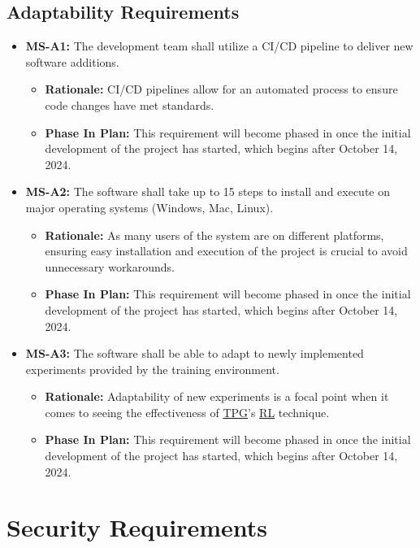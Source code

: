 \documentclass[12pt]{article}
\newcommand{\lips}{\textit{Insert your content here.}}
\begin{document}
\subsection{Adaptability Requirements}
\begin{itemize}
  \item \label{MS-A1} \textbf{MS-A1:} The development team shall utilize a CI/CD pipeline to deliver new software additions.
  \begin{itemize}
    \item \textbf{Rationale:} CI/CD pipelines allow for an automated process to ensure code changes have met standards. 
    \item \textbf{Phase In Plan:} This requirement will become phased in once the initial development of the project has started, which begins after October 14, 2024. 
  \end{itemize}
  \item \label{MS-A2} \textbf{MS-A2:} The software shall take up to 15 steps to install and execute on major operating systems (Windows, Mac, Linux).
  \begin{itemize}
    \item \textbf{Rationale:} As many users of the system are on different platforms, ensuring easy installation and execution of the project is crucial to avoid unnecessary workarounds.
    \item \textbf{Phase In Plan:} This requirement will become phased in once the initial development of the project has started, which begins after October 14, 2024. 
  \end{itemize}
  \item \label{MS-A3} \textbf{MS-A3:} The software shall be able to adapt to newly implemented experiments provided by the training environment.
  \begin{itemize}
    \item \textbf{Rationale:} Adaptability of new experiments is a focal point when it comes to seeing the effectiveness of \hyperref[def:tpg]{TPG}’s \hyperref[def:rl]{RL} technique.
    \item \textbf{Phase In Plan:} This requirement will become phased in once the initial development of the project has started, which begins after October 14, 2024. 
  \end{itemize}
\end{itemize}



\section{Security Requirements}
\end{document}

